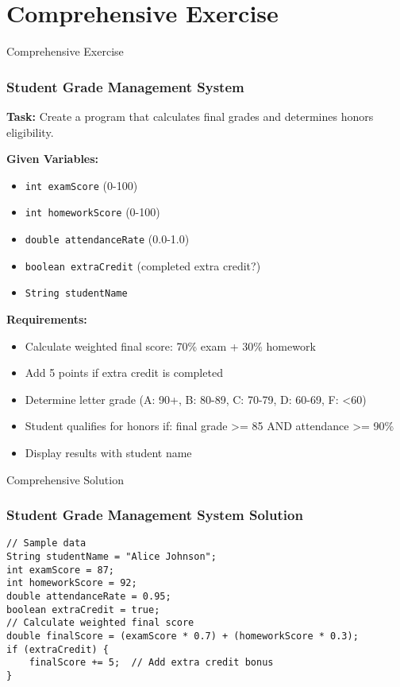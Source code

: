 \documentclass[aspectratio=169]{beamer}
\begin{document}
\section{Comprehensive Exercise}

\begin{frame}{Comprehensive Exercise}
    \frametitle{Student Grade Management System}
    
    \textbf{Task:} Create a program that calculates final grades and determines honors eligibility.
    
    \vspace{0.5em}
    
    \textbf{Given Variables:}
    \begin{itemize}
        \item \texttt{int examScore} (0-100)
        \item \texttt{int homeworkScore} (0-100)
        \item \texttt{double attendanceRate} (0.0-1.0)
        \item \texttt{boolean extraCredit} (completed extra credit?)
        \item \texttt{String studentName}
    \end{itemize}
    
    \vspace{0.5em}
    
    \textbf{Requirements:}
    \begin{itemize}
        \item Calculate weighted final score: 70\% exam + 30\% homework
        \item Add 5 points if extra credit is completed
        \item Determine letter grade (A: 90+, B: 80-89, C: 70-79, D: 60-69, F: <60)
        \item Student qualifies for honors if: final grade >= 85 AND attendance >= 90\%
        \item Display results with student name
    \end{itemize}
\end{frame}

\begin{frame}[fragile]{Comprehensive Solution}
    \frametitle{Student Grade Management System Solution}
    
    \begin{lstlisting}
// Sample data
String studentName = "Alice Johnson";
int examScore = 87;
int homeworkScore = 92; 
double attendanceRate = 0.95;
boolean extraCredit = true;
// Calculate weighted final score
double finalScore = (examScore * 0.7) + (homeworkScore * 0.3);
if (extraCredit) {
    finalScore += 5;  // Add extra credit bonus
}

    \end{lstlisting}
\end{frame}
\end{document}

